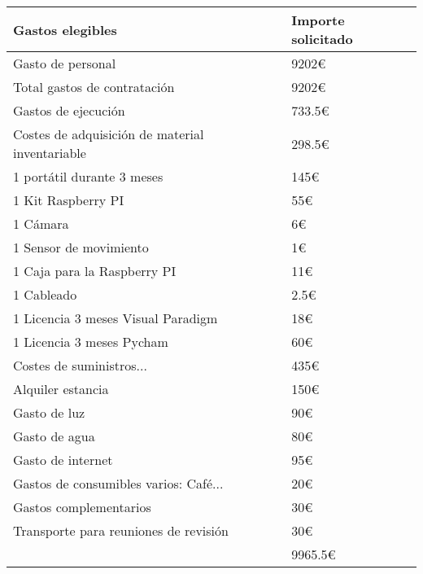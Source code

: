 \begin{table}[H]
\centering
\begin{tabular}{|l|l|}
\hline
\rowcolor[HTML]{4F81BD} 
{\color[HTML]{FFFFFF} \textbf{Gastos elegibles}} & {\color[HTML]{FFFFFF} \textbf{Importe solicitado}} \\ \hline
\rowcolor[HTML]{EFEFEF} 
{\color[HTML]{FE0000} Gasto de personal} & {\color[HTML]{FE0000} 9202\euro} \\ \hline
\hspace{1cm}Total gastos de contratación & {\color[HTML]{F56B00} 9202\euro} \\ \hline
\rowcolor[HTML]{EFEFEF} 
{\color[HTML]{FE0000} Gastos de ejecución} & {\color[HTML]{FE0000} 733.5\euro} \\ \hline
Costes de adquisición de material inventariable & {\color[HTML]{F56B00} 298.5\euro} \\ \hline
\hspace{1cm}1 portátil durante 3 meses & 145\euro \\ \hline
\hspace{1cm}1 Kit Raspberry PI & 55\euro \\ \hline
\hspace{1cm}1 Cámara & 6\euro \\ \hline
\hspace{1cm}1 Sensor de movimiento & 1\euro \\ \hline
\hspace{1cm}1 Caja para la Raspberry PI & 11\euro \\ \hline
\hspace{1cm}1 Cableado & 2.5\euro \\ \hline
\hspace{1cm}1 Licencia 3 meses Visual Paradigm & 18\euro \\ \hline
\hspace{1cm}1 Licencia 3 meses Pycham & 60\euro \\ \hline
Costes de suministros... & {\color[HTML]{F56B00} 435\euro} \\ \hline
\hspace{1cm}Alquiler estancia & 150\euro \\ \hline
\hspace{1cm}Gasto de luz & 90\euro \\ \hline
\hspace{1cm}Gasto de agua & 80\euro \\ \hline
\hspace{1cm}Gasto de internet & 95\euro \\ \hline
\hspace{1cm}Gastos de consumibles varios: Café... & 20\euro \\ \hline
\rowcolor[HTML]{EFEFEF} 
{\color[HTML]{FE0000} Gastos complementarios} & {\color[HTML]{FE0000} 30\euro} \\ \hline
\hspace{1cm}Transporte para reuniones de revisión & 30\euro \\ \hline
\rowcolor[HTML]{EFEFEF} 
\multicolumn{1}{|r|}{\cellcolor[HTML]{EFEFEF}\textbf{Coste total}} & {\color[HTML]{FE0000} 9965.5\euro} \\ \hline
\end{tabular}
\end{table}

